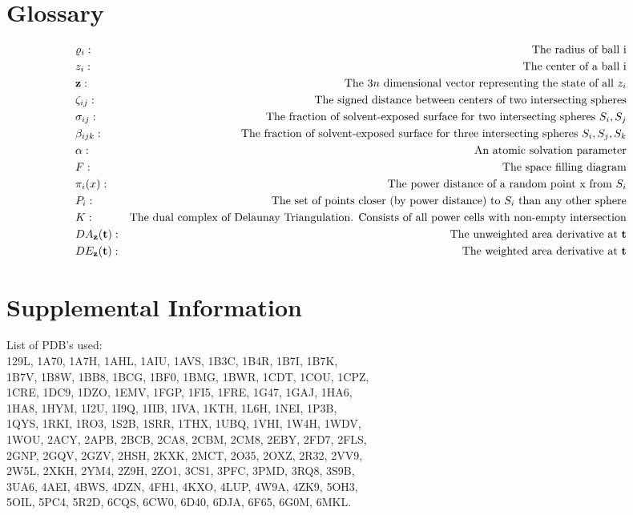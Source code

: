 \documentclass{article}
\begin{document}
\section{Glossary}
\begin{align*}
&\varrho_i:&\text{The radius of ball i} \\
&z_i:&\text{The center of a ball i} \\
&{\bf z}:&\text{The $3n$ dimensional vector representing the state of all $z_i$} \\
&\zeta_{ij}:&\text{The signed distance between centers of two intersecting spheres} \\
&\sigma_{ij}:&\text{The fraction of solvent-exposed surface for two intersecting spheres $S_i,S_j$} \\
&\beta_{ijk}:&\text{The fraction of solvent-exposed surface for three intersecting spheres $S_i,S_j, S_k$} \\
&\alpha:&\text{An atomic solvation parameter} \\
&F:&\text{The space filling diagram} \\
&\pi_i(x):&\text{The power distance of a random point x from $S_i$} \\
&P_i:&\text{The set of points closer (by power distance) to $S_i$ than any other sphere} \\
&K:&\text{The dual complex of Delaunay Triangulation. Consists of all power cells with non-empty intersection} \\
&DA_{\bf z}({\bf t}):&\text{The unweighted area derivative at \textbf{t}} \\
&DE_{\bf z}({\bf t}):&\text{The weighted area derivative at \textbf{t}} \\
\end{align*}

\section{Supplemental Information}
List of PDB's used: \\
129L, 1A70, 1A7H, 1AHL, 1AIU, 1AVS, 1B3C, 1B4R, 1B7I, 1B7K,\\
1B7V, 1B8W, 1BB8, 1BCG, 1BF0, 1BMG, 1BWR, 1CDT, 1COU, 1CPZ,\\
1CRE, 1DC9, 1DZO, 1EMV, 1FGP, 1FI5, 1FRE, 1G47, 1GAJ, 1HA6,\\
1HA8, 1HYM, 1I2U, 1I9Q, 1IIB, 1IVA, 1KTH, 1L6H, 1NEI, 1P3B,\\
1QYS, 1RKI, 1RO3, 1S2B, 1SRR, 1THX, 1UBQ, 1VHI, 1W4H, 1WDV,\\
1WOU, 2ACY, 2APB, 2BCB, 2CA8, 2CBM, 2CM8, 2EBY, 2FD7, 2FLS,\\
2GNP, 2GQV, 2GZV, 2HSH, 2KXK, 2MCT, 2O35, 2OXZ, 2R32, 2VV9,\\
2W5L, 2XKH, 2YM4, 2Z9H, 2ZO1, 3CS1, 3PFC, 3PMD, 3RQ8, 3S9B,\\
3UA6, 4AEI, 4BWS, 4DZN, 4FH1, 4KXO, 4LUP, 4W9A, 4ZK9, 5OH3,\\
5OIL, 5PC4, 5R2D, 6CQS, 6CW0, 6D40, 6DJA, 6F65, 6G0M, 6MKL.
\end{document}
